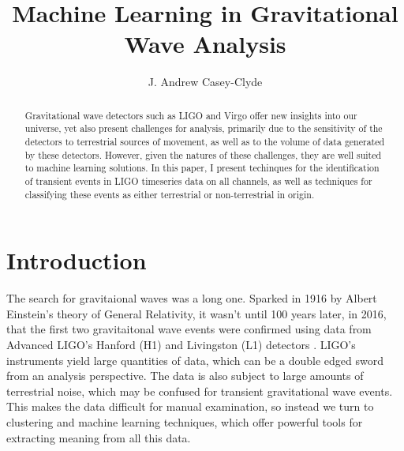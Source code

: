 \documentclass{article}
\begin{document}

\title{Machine Learning in Gravitational Wave Analysis}
\author{J. Andrew Casey-Clyde}
\maketitle





\begin{abstract}
Gravitational wave detectors such as LIGO and Virgo offer new insights into our universe, yet also present challenges for analysis, primarily due to the sensitivity of the detectors to terrestrial sources of movement, as well as to the volume of data generated by these detectors. However, given the natures of these challenges, they are well suited to machine learning solutions. In this paper, I present techinques for the identification of transient events in LIGO timeseries data on all channels, as well as techniques for classifying these events as either terrestrial or non-terrestrial in origin. 
\end{abstract}
\section{Introduction}
The search for gravitaional waves was a long one. Sparked in 1916 by Albert Einstein's theory of General Relativity, it wasn't until 100 years later, in 2016, that the first two gravitaitonal wave events were confirmed using data from Advanced LIGO's Hanford (H1) and Livingston (L1) detectors\citep{TheLIGOScientificCollaboration2016} \citep{Abbott2016}. LIGO's instruments yield large quantities of data, which can be a double edged sword from an analysis perspective. The data is also subject to large amounts of terrestrial noise, which may be confused for transient gravitational wave events. This makes the data difficult for manual examination, so instead we turn to clustering and machine learning techniques, which offer powerful tools for extracting meaning from all this data.
\end{document}
